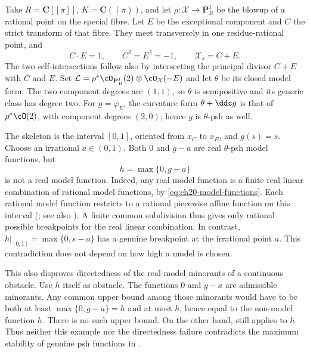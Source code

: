 \begin{example}
\label{ex:ch20-real-max-irrational-breakpoint}
Take $R=\mathbf C[[\pi]]$, $K=\mathbf C((\pi))$, and let
$\rho:\mathcal X\to\mathbf P^1_R$ be the blowup of a rational point
on the special fibre.  Let $E$ be the exceptional component and $C$
the strict transform of that fibre.  They meet transversely in one
residue-rational point, and
\[
 C\cdot E=1,\qquad C^2=E^2=-1,\qquad \mathcal X_s=C+E.
\]
The two self-intersections follow also by intersecting the principal
divisor $C+E$ with $C$ and $E$.  Set
$\mathcal L=\rho^*\cO_{\mathbf P^1_R}(2)\otimes\cO_{\mathcal X}(-E)$
and let $\theta$ be its closed model form.  The two component degrees
are $(1,1)$, so $\theta$ is semipositive and its generic class has
degree two.  For $g=\varphi_E$, the curvature form
$\theta+\ddc g$ is that of $\rho^*\cO(2)$, with component degrees
$(2,0)$; hence $g$ is $\theta$-psh as well.

The skeleton is the interval $[0,1]$, oriented from $x_C$ to
$x_E$, and $g(s)=s$.  Choose an irrational $a\in(0,1)$.
Both $0$ and $g-a$ are real $\theta$-psh model functions, but
\[
                    h=\max\{0,g-a\}
\]
is not a real model function.  Indeed, any real model function is a
finite real linear combination of rational model functions, by
\eqref{eq:ch20-model-functions}.  Each rational model function restricts
to a rational piecewise affine function on this interval
(; see also
\cite[Proposition~3.12 and Corollary~3.13]{BFJ16}).  A finite common
subdivision thus gives only rational possible breakpoints for the real
linear combination.  In contrast, $h|_{[0,1]}=\max\{0,s-a\}$ has a
genuine breakpoint at the irrational point $a$.  This contradiction
does not depend on how high a model is chosen.

This also disproves directedness of the real-model minorants of a
continuous obstacle.  Use $h$ itself as obstacle.  The functions
$0$ and $g-a$ are admissible minorants.  Any common upper bound
among those minorants would have to be both at least
$\max\{0,g-a\}=h$ and at most $h$, hence equal to the non-model
function $h$.  There is no such upper bound.  On the other hand,
 still applies to $h$.
Thus neither this example nor the directedness failure contradicts the
maximum stability of genuine psh functions in
.
\end{example}

